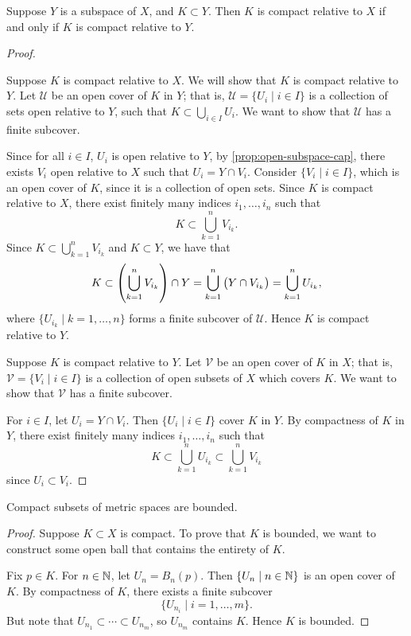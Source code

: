 \begin{proposition}
Suppose $Y$ is a subspace of $X$, and $K\subset Y$. Then $K$ is compact relative to $X$ if and only if $K$ is compact relative to $Y$.
\end{proposition}

\begin{proof} \

\fbox{$\implies$} Suppose $K$ is compact relative to $X$. We will show that $K$ is compact relative to $Y$. Let $\mathcal{U}$ be an open cover of $K$ in $Y$; that is, $\mathcal{U}=\{U_i\mid i\in I\}$ is a collection of sets open relative to $Y$, such that $K\subset\bigcup_{i\in I}U_i$. We want to show that $\mathcal{U}$ has a finite subcover.

Since for all $i\in I$, $U_i$ is open relative to $Y$, by \cref{prop:open-subspace-cap}, there exists $V_i$ open relative to $X$ such that $U_i=Y\cap V_i$. Consider $\{V_i\mid i\in I\}$, which is an open cover of $K$, since it is a collection of open sets. Since $K$ is compact relative to $X$, there exist finitely many indices $i_1,\dots,i_n$ such that
\[K\subset\bigcup_{k=1}^{n}V_{i_k}.\]
Since $K\subset\bigcup_{k=1}^{n}V_{i_k}$ and $K\subset Y$, we have that
\[K\subset\left(\bigcup_{k=1}^{n}V_{i_k}\right)\cap Y=\bigcup_{k=1}^{n}\left(Y\cap V_{i_k}\right)=\bigcup_{k=1}^{n}U_{i_k},\]
where $\{U_{i_k}\mid k=1,\dots,n\}$ forms a finite subcover of $\mathcal{U}$. Hence $K$ is compact relative to $Y$.

\fbox{$\impliedby$} Suppose $K$ is compact relative to $Y$. Let $\mathcal{V}$ be an open cover of $K$ in $X$; that is, $\mathcal{V}=\{V_i\mid i\in I\}$ is a collection of open subsets of $X$ which covers $K$. We want to show that $\mathcal{V}$ has a finite subcover.

For $i\in I$, let $U_i=Y\cap V_i$. Then $\{U_i\mid i\in I\}$ cover $K$ in $Y$. By compactness of $K$ in $Y$, there exist finitely many indices $i_1,\dots,i_n$ such that
\[K\subset\bigcup_{k=1}^{n}U_{i_k}\subset\bigcup_{k=1}^{n}V_{i_k}\]
since $U_i\subset V_i$.
\end{proof}

\begin{proposition}\label{prop:compact-bounded}
Compact subsets of metric spaces are bounded.
\end{proposition}

\begin{proof}
Suppose $K\subset X$ is compact. To prove that $K$ is bounded, we want to construct some open ball that contains the entirety of $K$.

Fix $p\in K$. For $n\in\mathbb N$, let $U_n=B_n(p)$. Then $\{U_n\mid n\in\mathbb N\}$ is an open cover of $K$. By compactness of $K$, there exists a finite subcover
\[\{U_{n_i}\mid i=1,\dots,m\}.\]
But note that $U_{n_1}\subset\cdots\subset U_{n_m}$, so $U_{n_m}$ contains $K$. Hence $K$ is bounded.
\end{proof}


